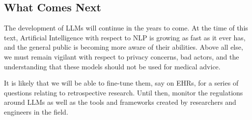 \subsection{What Comes Next}

The development of LLMs will continue in the years to come. At the time of this text, Artificial Intelligence with respect to NLP is growing as fast as it ever has, and the general public is becoming more aware of their abilities. Above all else, we
must remain vigilant with respect to privacy concerns, bad actors, and the understanding that these models should not be used for medical advice.

It is likely that we will be able to fine-tune them, say on EHRs, for a series of questions relating to retrospective research. Until then, monitor the regulations around LLMs as well as the tools and frameworks created by researchers and engineers in the field.
